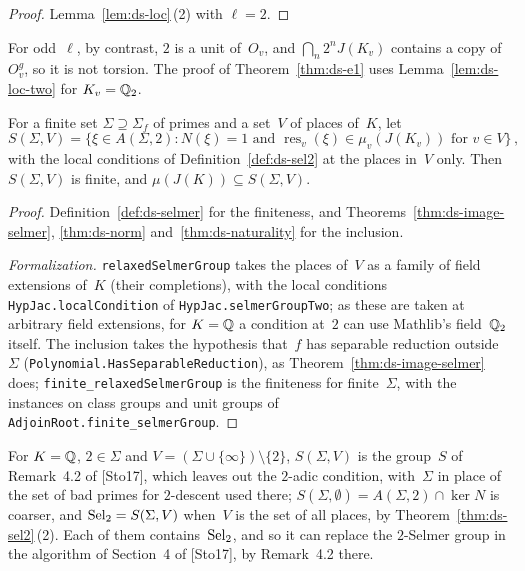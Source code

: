 \begin{proof}
\leanok
Lemma~\ref{lem:ds-loc}\,(2) with $\ell = 2$.
\end{proof}

For odd~$\ell$, by contrast, $2$ is a unit of~$O_v$, and $\bigcap_n 2^nJ(K_v)$ contains a copy
of~$O_v^g$, so it is not torsion. The proof of Theorem~\ref{thm:ds-e1} uses
Lemma~\ref{lem:ds-loc-two} for $K_v = \mathbb{Q}_2$.

\begin{definition}
\label{def:ds-relaxed}
\leanok
{}
For a finite set $\Sigma \supseteq \Sigma_f$ of primes and a set~$V$ of places of~$K$, let
\[ S(\Sigma, V) = \{\xi \in A(\Sigma, 2) : N(\xi) = 1 \text{ and } \operatorname{res}_v(\xi)
   \in \mu_v(J(K_v)) \text{ for } v \in V\}\,, \]
with the local conditions of Definition~\ref{def:ds-sel2} at the places in~$V$ only. Then
$S(\Sigma, V)$ is finite, and $\mu(J(K)) \subseteq S(\Sigma, V)$.
\end{definition}

\begin{proof}
\leanok
{}
Definition~\ref{def:ds-selmer} for the finiteness, and Theorems~\ref{thm:ds-image-selmer},
\ref{thm:ds-norm} and~\ref{thm:ds-naturality} for the inclusion.

\emph{Formalization.} \texttt{relaxedSelmerGroup} takes the places of~$V$ as a family of field
extensions of~$K$ (their completions), with the local conditions \texttt{HypJac.localCondition}
of \texttt{HypJac.selmerGroupTwo}; as these are taken at arbitrary field extensions, for $K = \mathbb{Q}$
a condition at~$2$ can use Mathlib's field~$\mathbb{Q}_2$ itself. The inclusion takes the hypothesis
that~$f$ has separable reduction outside~$\Sigma$ (\texttt{Polynomial.HasSeparableReduction}), as
Theorem~\ref{thm:ds-image-selmer} does; \texttt{finite\_relaxedSelmerGroup} is the finiteness for
finite~$\Sigma$, with the instances on class groups and unit groups of
\texttt{AdjoinRoot.finite\_selmerGroup}.
\end{proof}

For $K = \mathbb{Q}$, $2 \in \Sigma$ and $V = (\Sigma \cup \{\infty\}) \setminus \{2\}$, $S(\Sigma, V)$ is
the group~$S$ of Remark~4.2 of [Sto17], which leaves out the $2$-adic condition, with~$\Sigma$ in
place of the set of bad primes for $2$-descent used there; $S(\Sigma, \emptyset) = A(\Sigma, 2) \cap
\ker N$ is coarser, and $\operatorname{Sel}_2 = S(\Sigma, V)$ when~$V$ is the set of all places, by
Theorem~\ref{thm:ds-sel2}\,(2). Each of them contains~$\operatorname{Sel}_2$, and so it can replace the
$2$-Selmer group in the algorithm of Section~4 of [Sto17], by Remark~4.2 there.

